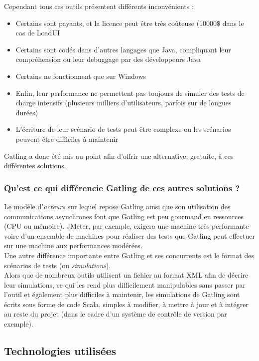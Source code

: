 Cependant tous ces outils présentent différents inconvénients :
\begin{itemize}
	\item Certains sont payants, et la licence peut être très coûteuse (10000\$ dans le cas de LoadUI
	\item Certains sont codés dans d'autres langages que Java, compliquant leur compréhension ou leur debuggage par des développeurs Java
	\item Certains ne fonctionnent que sur Windows
	\item Enfin, leur performance ne permettent pas toujours de simuler des tests de charge intensifs (plusieurs milliers d'utilisateurs, parfois sur de longues durées)
	\item L'écriture de leur scénario de tests peut être complexe ou les scénarios peuvent être difficiles à maintenir\\
\end{itemize}

Gatling a donc été mis au point afin d'offrir une alternative, gratuite, à ces différentes solutions.

\subsubsection{Qu'est ce qui différencie Gatling de ces autres solutions ?}

Le modèle d'\textit{acteurs} sur lequel repose Gatling ainsi que son utilisation des communications asynchrones font que Gatling est peu gourmand en ressources (CPU ou mémoire).
JMeter, par exemple, exigera une machine très performante voire d'un ensemble de machines pour réaliser des tests que Gatling peut effectuer sur une machine aux performances modérées.\\

Une autre différence importante entre Gatling et ses concurrents est le format des scénarios de tests (ou \textit{simulations}).\\
Alors que de nombreux outils utilisent un fichier au format XML afin de décrire leur simulations, ce qui les rend plus difficilement manipulables sans passer par l'outil et également plus difficiles à maintenir, les simulations de Gatling sont écrits sous forme de code Scala, simples à modifier, à mettre à jour et à intégrer au reste du projet (dans le cadre d'un système de contrôle de version par exemple).

\subsection{Technologies utilisées}

